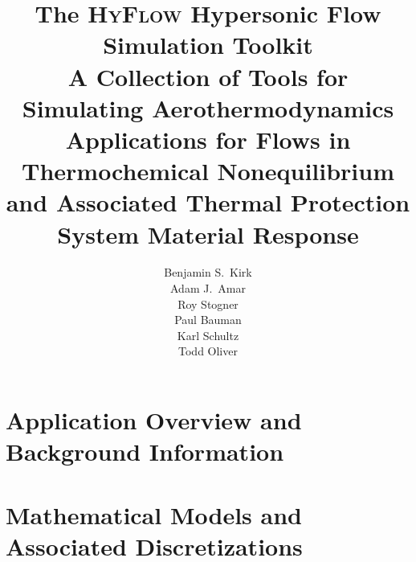 \documentclass[11pt,openright]{NASA}
\title{The \textsc{HyFlow} Hypersonic Flow Simulation Toolkit \\ \vspace{1em}  \large{A Collection of Tools for Simulating Aerothermodynamics Applications for Flows in Thermochemical Nonequilibrium and Associated Thermal Protection System Material Response}}
\author{Benjamin S.\ Kirk\\
        Adam J.\ Amar\\
        Roy Stogner\\
	Paul Bauman\\
        Karl Schultz\\
        Todd Oliver} %
\begin{document}
\cleardoublepage
\setcounter{tocdepth}{3}
\setcounter{secnumdepth}{3}

\tableofcontents
\listoffigures
\listoftables
{}

\cleardoublepage
\pagestyle{fancy}
\fancyhead[LE]{\textsc{\nouppercase{\leftmark}}}
\fancyhead[RE]{}
\fancyhead[LO]{}
\fancyhead[RO]{\textsc{\nouppercase{\rightmark}}}
\fancyfoot[C]{\thepage}
\fancyfoot[LO,RE]{\textit{{\color{red}{built \timestamp}}}}



\layout

\part{Application Overview and Background Information}




\part{Mathematical Models and Associated Discretizations}





\end{document}
